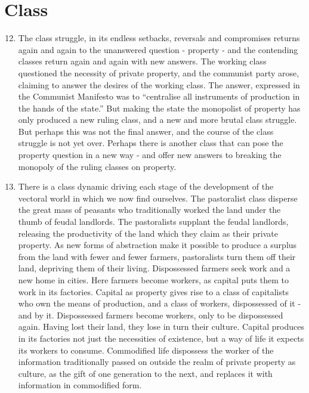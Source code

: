 \documentclass[letterpaper,12pt,english]{sphinxmanual}
\begin{document}
\section{Class}
\label{wark:class}\begin{enumerate}
\setcounter{enumi}{11}
\item {} 
The class struggle, in its endless setbacks, reversals and compromises returns again and again to the unanswered question - property - and the contending classes return again and again with new answers. The working class questioned the necessity of private property, and the communist party arose, claiming to answer the desires of the working class. The answer, expressed in the Communist Manifesto was to ``centralise all instruments of production in the hands of the state.'' But making the state the monopolist of property has only produced a new ruling class, and a new and more brutal class struggle. But perhaps this was not the final answer, and the course of the class struggle is not yet over. Perhaps there is another class that can pose the property question in a new way - and offer new answers to breaking the monopoly of the ruling classes on property.

\item {} 
There is a class dynamic driving each stage of the development of the vectoral world in which we now find ourselves. The pastoralist class disperse the great mass of peasants who traditionally worked the land under the thumb of feudal landlords. The pastoralists supplant the feudal landlords, releasing the productivity of the land which they claim as their private property. As new forms of abstraction make it possible to produce a surplus from the land with fewer and fewer farmers, pastoralists turn them off their land, depriving them of their living. Dispossessed farmers seek work and a new home in cities. Here farmers become workers, as capital puts them to work in its factories. Capital as property gives rise to a class of capitalists who own the means of production, and a class of workers, dispossessed of it - and by it. Dispossessed farmers become workers, only to be dispossessed again. Having lost their land, they lose in turn their culture. Capital produces in its factories not just the necessities of existence, but a way of life it expects its workers to consume. Commodified life dispossess the worker of the information traditionally passed on outside the realm of private property as culture, as the gift of one generation to the next, and replaces it with information in commodified form.


\end{enumerate}
\end{document}
